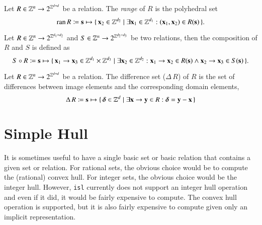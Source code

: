 \begin{definition}
Let $R \in \mathbb{Z}^n \to 2^{\mathbb{Z}^{d+d}}$ be a relation.
The {\em range} of $R$ is the polyhedral set
$$
\range R \coloneqq \vec s \mapsto
\{\, \vec x_2 \in \Z^{d_2} \mid \exists \vec x_1 \in \Z^{d_1} :
(\vec x_1, \vec x_2) \in R(\vec s) \,\}
.
$$
\end{definition}

\begin{definition}
Let $R \in \mathbb{Z}^n \to 2^{\mathbb{Z}^{d_1+d_2}}$ and
$S \in \mathbb{Z}^n \to 2^{\mathbb{Z}^{d_2+d_3}}$ be two relations,
then the composition of
$R$ and $S$ is defined as
$$
S \circ R \coloneqq
\vec s \mapsto
\{\, \vec x_1 \to \vec x_3 \in \Z^{d_1} \times \Z^{d_3}
\mid \exists \vec x_2 \in \Z^{d_2} :
\vec x_1 \to \vec x_2 \in R(\vec s) \wedge
\vec x_2 \to \vec x_3 \in S(\vec s)
\,\}
.
$$
\end{definition}

\begin{definition}
Let $R \in \mathbb{Z}^n \to 2^{\mathbb{Z}^{d+d}}$ be a relation.
The difference set ($\Delta \, R$) of $R$ is the set
of differences between image elements and the corresponding
domain elements,
$$
\Delta \, R \coloneqq
\vec s \mapsto
\{\, \vec \delta \in \Z^{d} \mid \exists \vec x \to \vec y \in R :
\vec \delta = \vec y - \vec x
\,\}
$$
\end{definition}

\section{Simple Hull}\label{s:simple hull}

It is sometimes useful to have a single
basic set or basic relation that contains a given set or relation.
For rational sets, the obvious choice would be to compute the
(rational) convex hull.  For integer sets, the obvious choice
would be the integer hull.
However, {\tt isl} currently does not support an integer hull operation
and even if it did, it would be fairly expensive to compute.
The convex hull operation is supported, but it is also fairly
expensive to compute given only an implicit representation.

